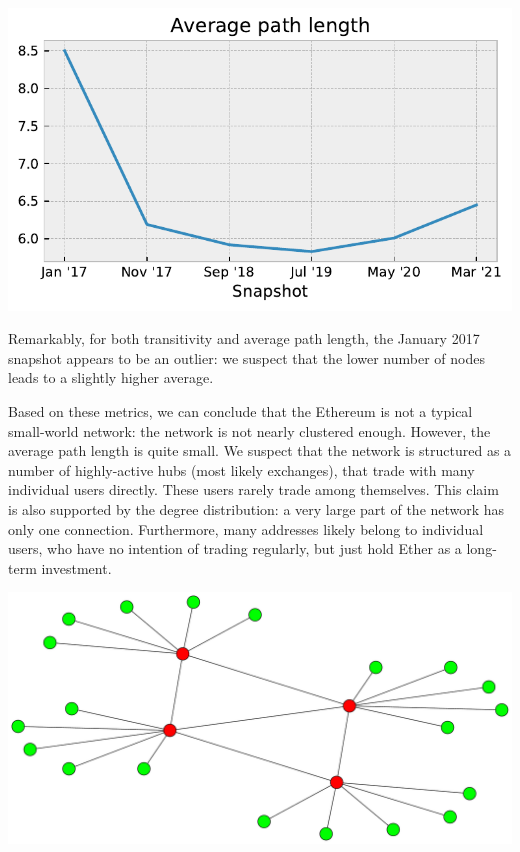 \documentclass[10pt,a4paper]{article}
\newenvironment{Figure}
  {\par\medskip\noindent\minipage{\linewidth}}
  {\endminipage\par\medskip}
\begin{document}
\begin{multicols}{2}
\begin{Figure}
\centering
\includegraphics[scale=0.55]{figures/average_path.pdf}
\end{Figure}

Remarkably, for both transitivity and average path length, the January 2017 snapshot appears to be an outlier: we suspect that the lower number of nodes leads to a slightly higher average.

Based on these metrics, we can conclude that the Ethereum is not a typical small-world network: the network is not nearly clustered enough. However, the average path length is quite small. We suspect that the network is structured as a number of highly-active hubs (most likely exchanges), that trade with many individual users directly. These users rarely trade among themselves. This claim is also supported by the degree distribution: a very large part of the network has only one connection. Furthermore, many addresses likely belong to individual users, who have no intention of trading regularly, but just hold Ether as a long-term investment.

\vspace{5pt}
\begin{Figure}
\centering
\includegraphics[scale=0.2]{figures/actual_structure.pdf}
\end{Figure}


\end{multicols}
\end{document}
